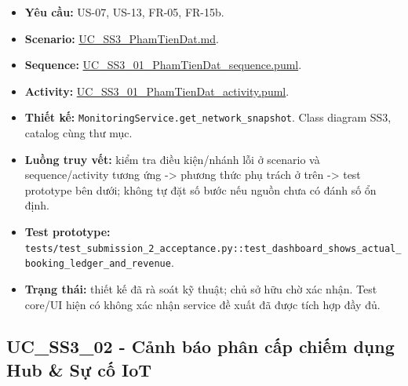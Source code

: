 \documentclass[11pt,a4paper]{article}
\providecommand{\tightlist}{%
  \setlength{\itemsep}{0pt}\setlength{\parskip}{0pt}}
\begin{document}
\begin{itemize}
\tightlist
\item
  \textbf{Yêu cầu:} US-07, US-13, FR-05, FR-15b.
\item
  \textbf{Scenario:}
  \href{../../../../docs/diagrams/Use-case\%20detail-scenario/SS3/Usecase\%20scenario/UC_SS3_PhamTienDat.md}{UC\_SS3\_PhamTienDat.md}.
\item
  \textbf{Sequence:}
  \href{../../../../docs/diagrams/Use-case\%20detail-scenario/SS3/Sequence\%20diagrams/UC_SS3_01_PhamTienDat_sequence.puml}{UC\_SS3\_01\_PhamTienDat\_sequence.puml}.
\item
  \textbf{Activity:}
  \href{../../../../docs/diagrams/Use-case\%20detail-scenario/SS3/Activity\%20diagrams/UC_SS3_01_PhamTienDat_activity.puml}{UC\_SS3\_01\_PhamTienDat\_activity.puml}.
\item
  \textbf{Thiết kế:} \texttt{MonitoringService.get\_network\_snapshot}.
  Class diagram SS3, catalog cùng thư mục.
\item
  \textbf{Luồng truy vết:} kiểm tra điều kiện/nhánh lỗi ở scenario và
  sequence/activity tương ứng -\textgreater{} phương thức phụ trách ở
  trên -\textgreater{} test prototype bên dưới; không tự đặt số bước nếu
  nguồn chưa có đánh số ổn định.
\item
  \textbf{Test prototype:}
  \texttt{tests/test\_submission\_2\_acceptance.py::test\_dashboard\_shows\_actual\_booking\_ledger\_and\_revenue}.
\item
  \textbf{Trạng thái:} thiết kế đã rà soát kỹ thuật; chủ sở hữu chờ xác
  nhận. Test core/UI hiện có không xác nhận service đề xuất đã được tích
  hợp đầy đủ.
\end{itemize}

\hypertarget{uc_ss3_02---cux1ea3nh-buxe1o-phuxe2n-cux1ea5p-chiux1ebfm-dux1ee5ng-hub-sux1ef1-cux1ed1-iot}{%
\subsection{UC\_SS3\_02 - Cảnh báo phân cấp chiếm dụng Hub \& Sự cố
IoT}\label{uc_ss3_02---cux1ea3nh-buxe1o-phuxe2n-cux1ea5p-chiux1ebfm-dux1ee5ng-hub-sux1ef1-cux1ed1-iot}}
\end{document}

